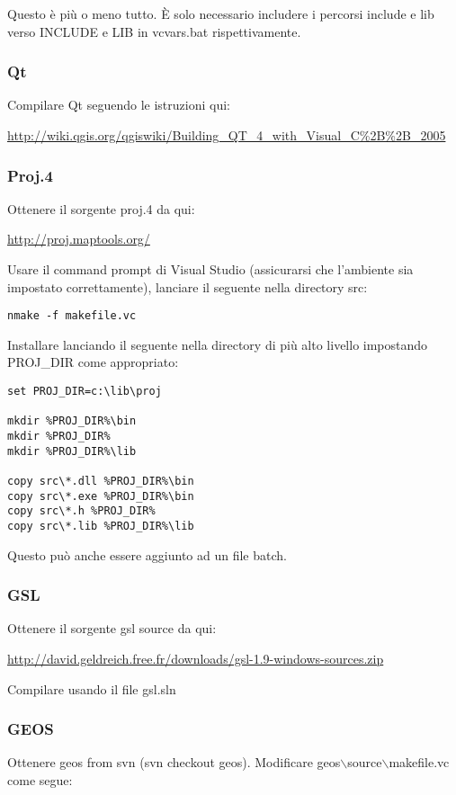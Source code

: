 Questo è più o meno tutto. È solo necessario includere i percorsi include e lib verso INCLUDE e LIB in vcvars.bat rispettivamente.

\subsubsection{Qt}
Compilare Qt seguendo le istruzioni qui:

\url{http://wiki.qgis.org/qgiswiki/Building\_QT\_4\_with\_Visual\_C\%2B\%2B\_2005}

\subsubsection{Proj.4}
Ottenere il sorgente proj.4 da qui:

\url{http://proj.maptools.org/}

Usare il command prompt di Visual Studio (assicurarsi che l'ambiente sia impostato correttamente), lanciare il seguente nella directory src:

\begin{verbatim}
nmake -f makefile.vc
\end{verbatim}

Installare lanciando il seguente nella directory di più alto livello impostando PROJ\_DIR come appropriato:

\begin{verbatim}
set PROJ_DIR=c:\lib\proj

mkdir %PROJ_DIR%\bin
mkdir %PROJ_DIR%
mkdir %PROJ_DIR%\lib

copy src\*.dll %PROJ_DIR%\bin
copy src\*.exe %PROJ_DIR%\bin
copy src\*.h %PROJ_DIR%
copy src\*.lib %PROJ_DIR%\lib 
\end{verbatim}

Questo può anche essere aggiunto ad un file batch.

\subsubsection{GSL}
Ottenere il sorgente gsl source da qui:

\url{http://david.geldreich.free.fr/downloads/gsl-1.9-windows-sources.zip}

Compilare usando il file gsl.sln

\subsubsection{GEOS}
Ottenere geos from svn (svn checkout  geos).
Modificare geos$\backslash$source$\backslash$makefile.vc come segue:

